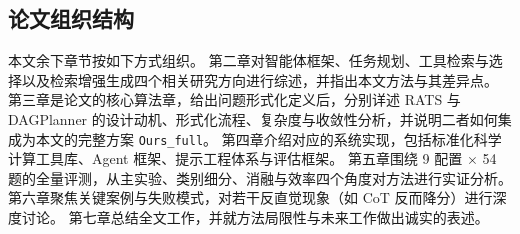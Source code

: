 \subsection{论文组织结构}

本文余下章节按如下方式组织。
第二章对智能体框架、任务规划、工具检索与选择以及检索增强生成四个相关研究方向进行综述，并指出本文方法与其差异点。
第三章是论文的核心算法章，给出问题形式化定义后，分别详述 RATS 与 DAGPlanner 的设计动机、形式化流程、复杂度与收敛性分析，并说明二者如何集成为本文的完整方案 \texttt{Ours\_full}。
第四章介绍对应的系统实现，包括标准化科学计算工具库、Agent 框架、提示工程体系与评估框架。
第五章围绕 9 配置 $\times$ 54 题的全量评测，从主实验、类别细分、消融与效率四个角度对方法进行实证分析。
第六章聚焦关键案例与失败模式，对若干反直觉现象（如 CoT 反而降分）进行深度讨论。
第七章总结全文工作，并就方法局限性与未来工作做出诚实的表述。
